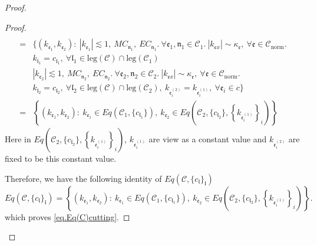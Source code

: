 \begin{proof}
\begin{proof}
\begin{equation}
\begin{split}
    \\
    =&\{(k_{\mathfrak{e}_1},k_{\mathfrak{e}_2}):\ |k_{\mathfrak{e}_1}| \lesssim 1,\ MC_{\mathfrak{n}_1},\  EC_{\mathfrak{n}_1}.\ \forall \mathfrak{e}_1, \mathfrak{n}_1\in\mathcal{C}_1.\ |k_{\mathfrak{e}x}| \sim \kappa_{\mathfrak{e}},\ \forall \mathfrak{e}\in \mathcal{C}_{\text{norm}}.
    \\
    &k_{\mathfrak{l}_1}=c_{\mathfrak{l}_1},\ \forall \mathfrak{l}_1\in \text{leg}(\mathcal{C})\cap \text{leg}(\mathcal{C}_1)
    \\
    &|k_{\mathfrak{e}_2}| \lesssim 1,\ MC_{\mathfrak{n}_2},\  EC_{\mathfrak{n}_2}.\ \forall \mathfrak{e}_2, \mathfrak{n}_2\in\mathcal{C}_2.\ |k_{\mathfrak{e}x}| \sim \kappa_{\mathfrak{e}},\ \forall \mathfrak{e}\in \mathcal{C}_{\text{norm}}.
    \\
    &k_{\mathfrak{l}_2}=c_{\mathfrak{l}_2},\ \forall \mathfrak{l}_2\in \text{leg}(\mathcal{C})\cap \text{leg}(\mathcal{C}_2),\ k_{\mathfrak{e}_{i}^{(2)}}=k_{\mathfrak{e}_{i}^{(1)}},\ \forall\mathfrak{e}_{i}\in c\}
    \\
    =&\left\{(k_{\mathfrak{e}_1},k_{\mathfrak{e}_{2}}):\ k_{\mathfrak{e}_1}\in Eq(\mathcal{C}_1,\{c_{\mathfrak{l}_1}\}),\  k_{\mathfrak{e}_{2}}\in Eq\left(\mathcal{C}_{2}, \{c_{\mathfrak{l}_2}\}, \left\{k_{\mathfrak{e}_{i}^{(1)}}\right\}_{i}\right)\right\}
\end{split}
\end{equation}
Here in $Eq\left(\mathcal{C}_{2}, \{c_{\mathfrak{l}_2}\}, \left\{k_{\mathfrak{e}_{i}^{(1)}}\right\}_{i}\right)$, $k_{\mathfrak{e}_{i}^{(1)}}$ are view as a constant value and $k_{\mathfrak{e}_{i}^{(2)}}$ are fixed to be this constant value.

Therefore, we have the following identity of $Eq(\mathcal{C},\{c_{\mathfrak{l}}\}_{\mathfrak{l}})$
\begin{equation}
    Eq(\mathcal{C},\{c_{\mathfrak{l}}\}_{\mathfrak{l}})=\left\{(k_{\mathfrak{e}_1},k_{\mathfrak{e}_{2}}):\ k_{\mathfrak{e}_1}\in Eq(\mathcal{C}_1,\{c_{\mathfrak{l}_1}\}),\  k_{\mathfrak{e}_{2}}\in Eq\left(\mathcal{C}_{2}, \{c_{\mathfrak{l}_2}\}, \left\{k_{\mathfrak{e}_{i}^{(1)}}\right\}_{i}\right)\right\}.
\end{equation}
which proves \eqref{eq.Eq(C)cutting}.


\end{proof}
\end{proof}
